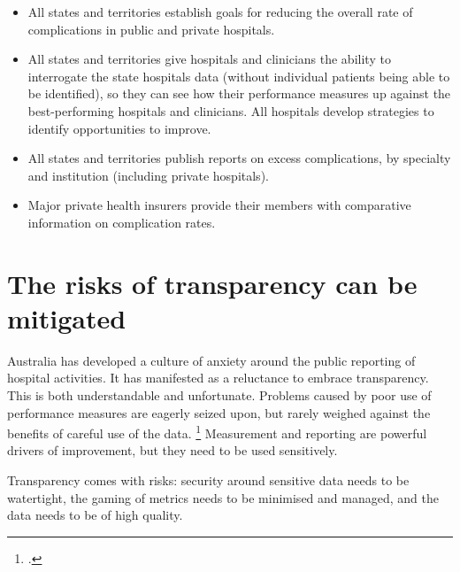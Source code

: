 \documentclass[FrontPage]{grattan}
\begin{document}
\begin{itemize}
\item All states and territories establish goals for reducing the overall rate of complications in public and private hospitals.

\item All states and territories give hospitals and clinicians the ability to interrogate the state hospitals data (without individual patients being able to be identified), so they can see how their performance measures up against the best-performing hospitals and clinicians.
All hospitals develop strategies to identify opportunities to improve.

\item All states and territories publish reports on excess complications, by specialty and institution (including private hospitals).

\item Major private health insurers provide their members with comparative information on complication rates.
\end{itemize}





















\appendix
\chapter{The risks of transparency can be mitigated}\label{chap:appendix-the-risks-of-transparency-can-be-mitigated}

Australia has developed a culture of anxiety around the public reporting of hospital activities.
It has manifested as a reluctance to embrace transparency.
This is both understandable and unfortunate.
Problems caused by poor use of performance measures are eagerly seized upon, but rarely weighed against the benefits of careful use of the data.%
	\footcite{mannion2012unintended}
Measurement and reporting are powerful drivers of improvement, but they need to be used sensitively.

Transparency comes with risks: security around sensitive data needs to be watertight, the gaming of metrics needs to be minimised and managed, and the data needs to be of high quality.
\end{document}

